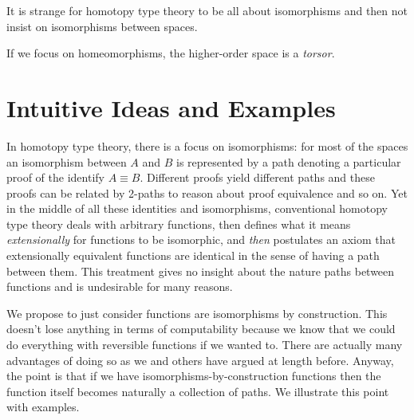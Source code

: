 \documentclass[11pt]{article}
\begin{document}
It is strange for homotopy type theory to be all about isomorphisms and then
not insist on isomorphisms between spaces.

If we focus on homeomorphisms, the higher-order space is a \emph{torsor}.

\section{Intuitive Ideas and Examples} 
\label{sec:intuition}


In homotopy type theory, there is a focus on isomorphisms: for most of the
spaces an isomorphism between $A$ and $B$ is represented by a path denoting a
particular proof of the identify $A \equiv B$. Different proofs yield
different paths and these proofs can be related by 2-paths to reason about
proof equivalence and so on. Yet in the middle of all these identities and
isomorphisms, conventional homotopy type theory deals with arbitrary
functions, then defines what it means \emph{extensionally} for functions to
be isomorphic, and \emph{then} postulates an axiom that extensionally
equivalent functions are identical in the sense of having a path between
them. This treatment gives no insight about the nature paths between
functions and is undesirable for many reasons. 

We propose to just consider functions are isomorphisms by construction. This
doesn't lose anything in terms of computability because we know that we could
do everything with reversible functions if we wanted to. There are actually
many advantages of doing so as we and others have argued at length
before. Anyway, the point is that if we have isomorphisms-by-construction
functions then the function itself becomes naturally a collection of
paths. We illustrate this point with examples.
\end{document}
